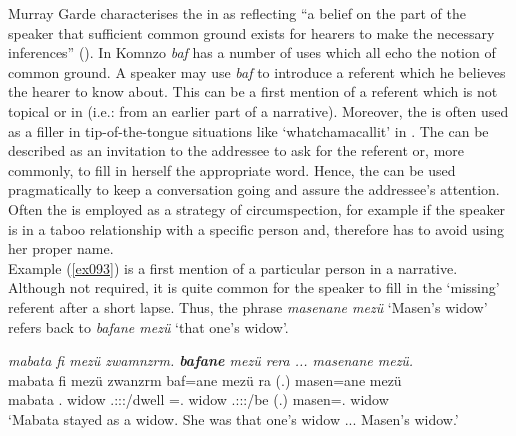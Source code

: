 Murray Garde characterises the   in  as reflecting ``a belief on the part of the speaker that sufficient common ground exists for hearers to make the necessary inferences'' (\citeyear[250]{Garde:2013ut}). In Komnzo \textit{baf} has a number of uses which all echo the notion of common ground. A speaker may use \emph{baf} to introduce a referent which he believes the hearer to know about. This can be a first mention of a referent which is not topical or in  (i.e.: from an earlier part of a narrative). Moreover, the  is often used as a filler in tip-of-the-tongue situations like `whatchamacallit' in . The  can be described as an invitation to the addressee to ask for the referent or, more commonly, to fill in herself the appropriate word. Hence, the  can be used pragmatically to keep a conversation going and assure the addressee's attention. Often the  is employed as a strategy of circumspection, for example if the speaker is in a taboo relationship with a specific person and, therefore has to avoid using her proper name.\\

Example (\ref{ex093}) is a first mention of a particular person in a narrative. Although not required, it is quite common for the speaker to fill in the `missing' referent after a short lapse. Thus, the phrase \emph{masenane mezü} `Masen's widow' refers back to \emph{bafane mezü} `that one's widow'.

\begin{exe}
	\ex \emph{mabata fi mezü zwamnzrm. \textbf{bafane} mezü rera ... masenane mezü.}\\
	\gll mabata fi mezü zwanzrm baf=ane mezü ra (.) masen=ane mezü\\
	mabata \Third.\Abs{} widow \Tsg{}.\F{}:\Sbj:\Pst:\Dur{}/dwell \Recog{}=\Poss.\Sg{} widow \Tsg{}.\F{}:\Sbj:\Pst:\Ipfv/be (.) masen=\Poss.\Sg{} widow\\
	\trans `Mabata stayed as a widow. She was that one's widow ... Masen's widow.'
	\label{ex093}
\end{exe}


